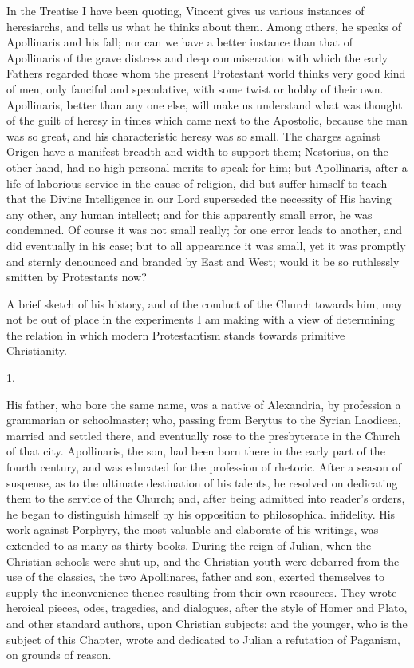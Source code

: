 In the Treatise I have been quoting, Vincent gives us various
instances of heresiarchs, and tells us what he thinks about them.
Among others, he speaks of Apollinaris and his fall; nor can we have a
better instance than that of Apollinaris of the grave distress and
deep commiseration with which the early Fathers regarded those whom
the present Protestant world thinks very good kind of men, only
fanciful and speculative, with some twist or hobby of their own.
Apollinaris, better than any one else, will make us understand what
was thought of the guilt of heresy in times which came next to the
Apostolic, because the man was so great, and his characteristic heresy
was so small. The charges against Origen have a manifest breadth and
width to support them; Nestorius, on the other hand, had no high
personal merits to speak for him; but Apollinaris, after a life of
laborious service in the cause of religion, did but suffer himself to
teach that the Divine Intelligence in our Lord superseded the
necessity of His having any other, any human intellect; and for this
apparently small error, he was condemned. Of course it was not small
really; for one error leads to another, and did eventually in his
case; but to all appearance it was small, yet it was promptly and
sternly denounced and branded by East and West; would it be so
ruthlessly smitten by Protestants now?

A brief sketch of his history, and of the conduct of the Church
towards him, may not be out of place in the experiments I am making
with a view of determining the relation in which modern Protestantism
stands towards primitive Christianity.

1.

His father, who bore the same name, was a native of Alexandria, by
profession a grammarian or schoolmaster; who, passing from Berytus to
the Syrian Laodicea, married and settled there, and eventually rose to
the presbyterate in the Church of that city. Apollinaris, the son, had
been born there in the early part of the fourth century, and was
educated for the profession of rhetoric. After a season of suspense,
as to the ultimate destination of his talents, he resolved on
dedicating them to the service of the Church; and, after being
admitted into reader's orders, he began to distinguish himself by his
opposition to philosophical infidelity. His work against Porphyry, the
most valuable and elaborate of his writings, was extended to as many
as thirty books. During the reign of Julian, when the Christian
schools were shut up, and the Christian youth were debarred from the
use of the classics, the two Apollinares, father and son, exerted
themselves to supply the inconvenience thence resulting from their own
resources. They wrote heroical pieces, odes, tragedies, and dialogues,
after the style of Homer and Plato, and other standard authors, upon
Christian subjects; and the younger, who is the subject of this
Chapter, wrote and dedicated to Julian a refutation of Paganism, on
grounds of reason.


